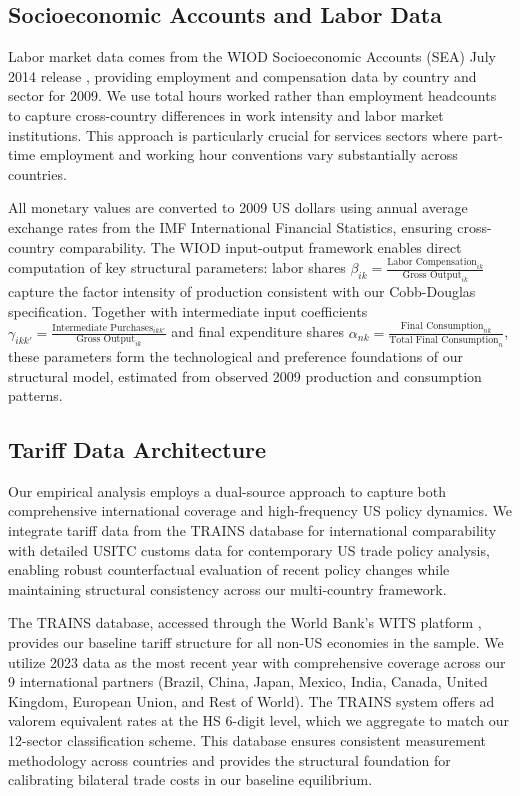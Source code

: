 



\subsection{Socioeconomic Accounts and Labor Data}

Labor market data comes from the WIOD Socioeconomic Accounts (SEA) July 2014 release \citep{timmer2015illustrated}, providing employment and compensation data by country and sector for 2009. We use total hours worked rather than employment headcounts to capture cross-country differences in work intensity and labor market institutions. This approach is particularly crucial for services sectors where part-time employment and working hour conventions vary substantially across countries.

All monetary values are converted to 2009 US dollars using annual average exchange rates from the IMF International Financial Statistics, ensuring cross-country comparability. The WIOD input-output framework enables direct computation of key structural parameters: labor shares $\beta_{ik} = \frac{\text{Labor Compensation}_{ik}}{\text{Gross Output}_{ik}}$ capture the factor intensity of production consistent with our Cobb-Douglas specification. Together with intermediate input coefficients $\gamma_{ikk'} = \frac{\text{Intermediate Purchases}_{ikk'}}{\text{Gross Output}_{ik}}$ and final expenditure shares $\alpha_{nk} = \frac{\text{Final Consumption}_{nk}}{\text{Total Final Consumption}_{n}}$, these parameters form the technological and preference foundations of our structural model, estimated from observed 2009 production and consumption patterns.

\subsection{Tariff Data Architecture}

Our empirical analysis employs a dual-source approach to capture both comprehensive international coverage and high-frequency US policy dynamics. We integrate tariff data from the TRAINS database for international comparability with detailed USITC customs data for contemporary US trade policy analysis, enabling robust counterfactual evaluation of recent policy changes while maintaining structural consistency across our multi-country framework.

The TRAINS database, accessed through the World Bank's WITS platform \citep{WITS2025}, provides our baseline tariff structure for all non-US economies in the sample. We utilize 2023 data as the most recent year with comprehensive coverage across our 9 international partners (Brazil, China, Japan, Mexico, India, Canada, United Kingdom, European Union, and Rest of World). The TRAINS system offers ad valorem equivalent rates at the HS 6-digit level, which we aggregate to match our 12-sector classification scheme. This database ensures consistent measurement methodology across countries and provides the structural foundation for calibrating bilateral trade costs in our baseline equilibrium.


